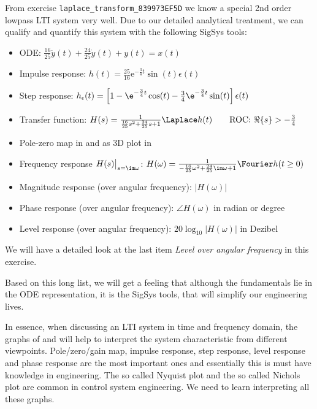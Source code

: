 From exercise \texttt{laplace\_transform\_839973EF5D} we know a special 2nd order lowpass LTI system very well.
Due to our detailed analytical treatment, we can qualify and quantify this system
with the following SigSys tools:
\begin{itemize}
\setlength\itemsep{-0.25em}
  \item ODE: $\frac{16}{25} \ddot{y}(t) + \frac{24}{25} \dot{y}(t) + y(t) = x(t)$
  \item Impulse response: $h(t) = \frac{25}{16} \mathrm{e}^{-\frac{3}{4} t} \sin(t) \epsilon(t)$
  \item Step response: $h_\epsilon(t)=\left[1
  - \e^{-\frac{3}{4} t} \cos(t)
  - \frac{3}{4}\e^{-\frac{3}{4} t} \sin(t) \right]\epsilon(t)$
  \item Transfer function:
  $H(s) = \frac{1}{\frac{16}{25} s^2 + \frac{24}{25} s + 1}\Laplace h(t)
  \qquad\text{ROC: }\Re\{s\}>-\frac{3}{4}$
  \item Pole-zero map in  and as 3D plot in
  \item Frequency response $H(s)\big|_{s=\im\omega}$:
  $H(\omega) = \frac{1}{-\frac{16}{25}\omega^2 + \frac{24}{25}\im\omega  + 1}
  \Fourier h(t \geq 0)$
  \item Magnitude response (over angular frequency): $|H(\omega)|$
  \item Phase response (over angular frequency): $\angle H(\omega)$ in radian or degree
  \item Level response (over angular frequency): $20 \log_{10}|H(\omega)|$ in Dezibel
\end{itemize}

We will have a detailed look at the last item \textit{Level over angular frequency}
in this exercise.

Based on this long list, we will get a feeling that although the fundamentals
lie in the ODE representation, it is the SigSys tools, that will simplify our
engineering lives.

\begin{mdframed}
In essence, when discussing an LTI system in time and frequency domain, the
graphs of  and 
will help to interpret the system characteristic from different viewpoints.
Pole/zero/gain map, impulse response, step response, level response and
phase response are the most important
ones and essentially this is must have knowledge in engineering.
The so called Nyquist plot and the so called Nichols plot are common in
control system engineering.
We need to learn interpreting all these graphs.
\end{mdframed}




